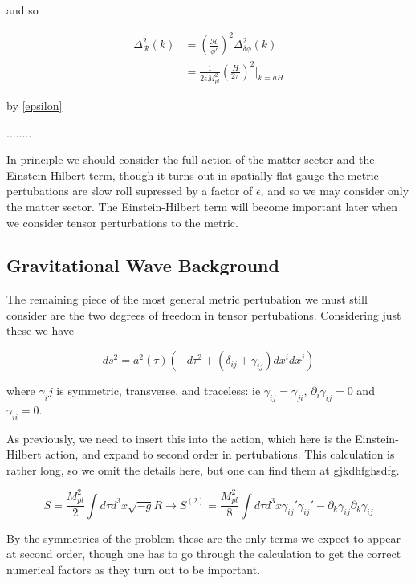 \documentclass[a4paper,11pt]{article}
\newcommand{\Mp}{M_{pl}}
\newcommand{\bphi}{\bar{\phi}}
\begin{document}
and so 

\begin{align}
\Delta^2_{\mathcal{R}}(k) &=(\frac{\mathcal{H}}{\bphi'})^2\Delta^2_{\delta\phi}(k)\\
&=\frac{1}{2\epsilon\Mp^2}(\frac{H}{2\pi})^2\rvert_{k=aH}
\end{align}

by \ref{epsilon}


........



 In principle we should consider the full action of the matter sector and the Einstein Hilbert term, though it turns out in spatially flat gauge the metric pertubations are slow roll supressed by a factor of $\epsilon$, and so we may consider only the matter sector. The Einstein-Hilbert term will become important later when we consider tensor perturbations to the metric.\\




\subsection{Gravitational Wave Background}

The remaining piece of the most general metric pertubation we must still consider are the two degrees of freedom in tensor pertubations. Considering just these we have

\begin{equation}
ds^2 = a^2(\tau)(-d\tau^2 + (\delta_{ij}+\gamma_{ij})dx^idx^j)
\end{equation}

where $\gamma_ij$ is symmetric, transverse, and traceless: ie $\gamma_{ij}=\gamma_{ji}$, $\partial_i\gamma_{ij}=0$ and $\gamma_{ii}=0$.

As previously, we need to insert this into the action, which here is the Einstein-Hilbert action, and expand to second order in pertubations. This calculation is rather long, so we omit the details here, but one can find them at gjkdhfghsdfg. 

\begin{equation}
S=\frac{\Mp^2}{2} \int d\tau d^3x \sqrt{-g}R \rightarrow S^{(2)} = \frac{\Mp^2}{8}\int d\tau d^3x \gamma_{ij}'\gamma_{ij}'-\partial_k\gamma_{ij}\partial_k\gamma_{ij}
\end{equation}

By the symmetries of the problem these are the only terms we expect to appear at second order, though one has to go through the calculation to get the correct numerical factors as they turn out to be important.
\end{document}
